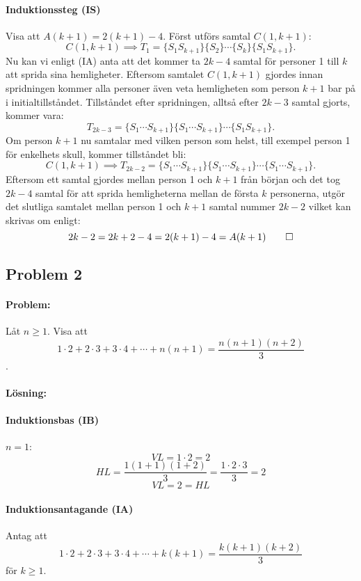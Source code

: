 \documentclass[12pt]{article}
\begin{document}
\paragraph{Induktionssteg (IS)} Visa att $A(k+1)=2(k+1)-4$.\newline\noindent
Först utförs samtal $C(1,k+1)$:
\[C(1,k+1) \implies T_1=\{S_1S_{k+1}\}\{S_2\}\cdots\{S_k\}\{S_1S_{k+1}\}.\]
Nu kan vi enligt (IA) anta att det kommer ta $2k-4$ samtal för personer 1 till $k$ att sprida sina hemligheter. Eftersom samtalet $C(1,k+1)$ gjordes innan spridningen kommer alla personer även veta hemligheten som person $k+1$ bar på i initialtillståndet. Tillståndet efter spridningen, alltså efter $2k-3$ samtal gjorts, kommer vara:
\[T_{2k-3}=\{S_1\cdots S_{k+1}\}\{S_1\cdots S_{k+1}\}\cdots\{S_1S_{k+1}\}.\]
Om person $k+1$ nu samtalar med vilken person som helst, till exempel person 1 för enkelhets skull, kommer tillståndet bli:
\[C(1,k+1) \implies T_{2k-2}=\{S_1\cdots S_{k+1}\}\{S_1\cdots S_{k+1}\}\cdots\{S_1\cdots S_{k+1}\}.\]
Eftersom ett samtal gjordes mellan person 1 och $k+1$ från början och det tog $2k-4$ samtal för att sprida hemligheterna mellan de första $k$ personerna, utgör det slutliga samtalet mellan person 1 och $k+1$ samtal nummer $2k-2$ vilket kan skrivas om enligt:
\[2k-2 = 2k+2-4 = 2(k+1)-4 = A(k+1) \qed \]
\newpage\noindent
\subsection*{Problem 2}
\paragraph{Problem:} Låt $n\ge1$. Visa att 
\[1\cdot 2+2\cdot 3+3\cdot 4+\cdots +n(n+1)=\frac{n(n+1)(n+2)}{3}\].

\paragraph{Lösning:}
\paragraph{Induktionsbas (IB)} $n=1$:
    \[VL = 1\cdot 2 = 2\]
    \[HL = \frac{1(1+1)(1+2)}{3} = \frac{1 \cdot 2 \cdot 3}{3} = 2\]
    \[VL = 2 = HL \]
\paragraph{Induktionsantagande (IA)} Antag att 
\[1\cdot 2+2\cdot 3+3\cdot 4+\cdots +k(k+1)=\frac{k(k+1)(k+2)}{3}\]
för $k\ge1$.
\end{document}

